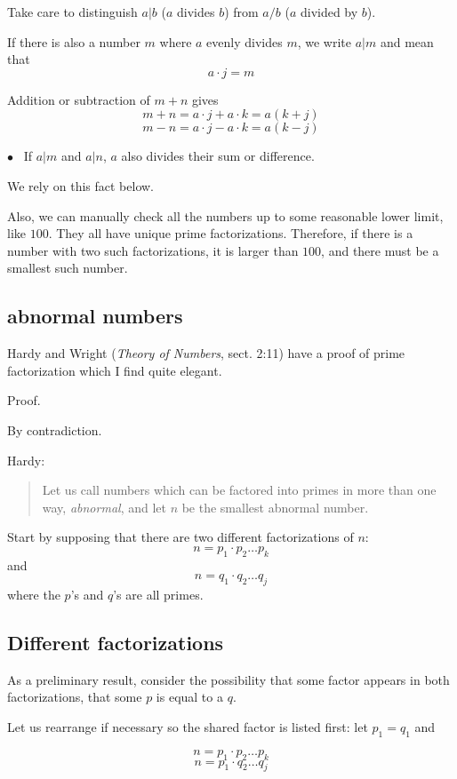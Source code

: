 \documentclass[11pt, oneside]{article}
\begin{document}
Take care to distinguish $a|b$ ($a$ divides $b$) from $a/b$ ($a$ divided by $b$).

If there is also a number $m$ where $a$ evenly divides $m$, we write $a|m$ and mean that
\[ a \cdot j = m \]

Addition or subtraction of $m + n$ gives
\[ m + n = a \cdot j + a \cdot k = a(k + j) \]
\[ m - n = a \cdot j - a \cdot k = a(k - j) \]

$\bullet$ \ If $a|m$ and $a|n$, $a$ also divides their sum or difference.

We rely on this fact below.

Also, we can manually check all the numbers up to some reasonable lower limit, like $100$.  They all have unique prime factorizations.  Therefore, if there is a number with two such factorizations, it is larger than $100$, and there must be a smallest such number.

\subsection*{abnormal numbers}

Hardy and Wright (\emph{Theory of Numbers}, sect. 2:11) have a proof of prime factorization which I find quite elegant.

Proof.

By contradiction.

Hardy:
\begin{quote}Let us call numbers which can be factored into primes in more than one way, \emph{abnormal}, and let $n$ be the smallest abnormal number.\end{quote}

Start by supposing that there are two different factorizations of $n$:
\[ n = p_1 \cdot p_2 \dots p_k \]
and
\[ n = q_1 \cdot q_2 \dots q_j \]
where the $p$'s and $q$'s are all primes.

\subsection*{Different factorizations}

As a preliminary result, consider the possibility that some factor appears in both factorizations, that some $p$ is equal to a $q$.

Let us rearrange if necessary so the shared factor is listed first:  let $p_1 = q_1$ and

\[ n = p_1 \cdot p_2 \dots p_k \]
\[ n = p_1 \cdot q_2 \dots q_j \]
\end{document}
